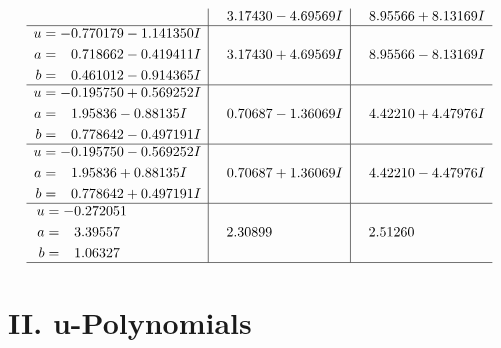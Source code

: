 \documentclass[1p]{elsarticle_modified}
\theoremstyle{definition}
\begin{document}
$$\begin{array}{c|c|c}
 & \phantom{-}3.17430 - 4.69569 I & \phantom{-}8.95566 + 8.13169 I \\ \hline\begin{aligned}
u &= -0.770179 - 1.141350 I \\
a &= \phantom{-}0.718662 - 0.419411 I \\
b &= \phantom{-}0.461012 - 0.914365 I\end{aligned}
 & \phantom{-}3.17430 + 4.69569 I & \phantom{-}8.95566 - 8.13169 I \\ \hline\begin{aligned}
u &= -0.195750 + 0.569252 I \\
a &= \phantom{-}1.95836 - 0.88135 I \\
b &= \phantom{-}0.778642 - 0.497191 I\end{aligned}
 & \phantom{-}0.70687 - 1.36069 I & \phantom{-}4.42210 + 4.47976 I \\ \hline\begin{aligned}
u &= -0.195750 - 0.569252 I \\
a &= \phantom{-}1.95836 + 0.88135 I \\
b &= \phantom{-}0.778642 + 0.497191 I\end{aligned}
 & \phantom{-}0.70687 + 1.36069 I & \phantom{-}4.42210 - 4.47976 I \\ \hline\begin{aligned}
u &= -0.272051\phantom{ +0.000000I} \\
a &= \phantom{-}3.39557\phantom{ +0.000000I} \\
b &= \phantom{-}1.06327\phantom{ +0.000000I}\end{aligned}
 & \phantom{-}2.30899\phantom{ +0.000000I} & \phantom{-}2.51260\phantom{ +0.000000I}\\
 \hline 
 \end{array}$$\newpage
\newpage\renewcommand{\arraystretch}{1}
\centering \section*{ II. u-Polynomials}
\end{document}
